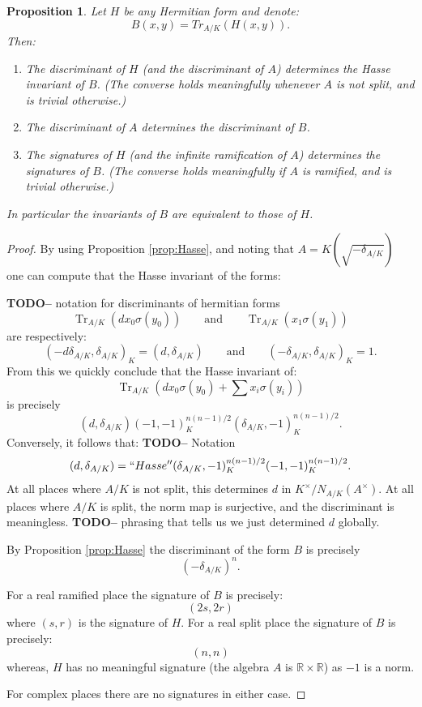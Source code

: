 \documentclass{article}
\theoremstyle{plain}
\newtheorem{proposition}[theorem]{Proposition}
\theoremstyle{definition}
\numberwithin{equation}{section}
\DeclareMathOperator{\Tr}{Tr}
\newcommand{\RR}{\mathbb{R}}
\newcommand{\TODO}[1]{\textbf{TODO-#1}}
\begin{document}
\begin{proposition}\label{prop:InvariantRelations}
Let $H$ be any Hermitian form and denote:
\[ B(x,y) = Tr_{A/K}(H(x,y)). \]
Then:
\begin{enumerate}
\item The discriminant of $H$ (and the discriminant of $A$) determines the Hasse invariant of $B$. (The converse holds meaningfully whenever $A$ is not split, and is trivial otherwise.)
\item The discriminant of $A$ determines the discriminant of $B$.
\item The signatures of $H$ (and the infinite ramification of $A$) determines the signatures of $B$. (The converse holds meaningfully if $A$ is ramified, and is trivial otherwise.)
\end{enumerate}
In particular the invariants of $B$ are equivalent to those of $H$.
\end{proposition}
\begin{proof}
By using Proposition \ref{prop:Hasse}, and noting that $A = K(\sqrt{-\delta_{A/K}})$ one can compute that the Hasse invariant of the forms:

\TODO - notation for discriminants of hermitian forms
\[\Tr_{A/K}(dx_0\sigma(y_0)) \qquad \text{and} \qquad \Tr_{A/K}(x_1\sigma(y_1)) \]
are respectively:
\[ (-d \delta_{A/K}, \delta_{A/K})_K = (d,\delta_{A/K}) \qquad \text{and}\qquad ( -\delta_{A/K}, \delta_{A/K})_K = 1. \]
From this we quickly conclude that the Hasse invariant of:
\[ \Tr_{A/K}\left(dx_0\sigma(y_0) + \sum x_i\sigma(y_i)\right) \]
is precisely
\[ (d,\delta_{A/K})(-1,-1)_K^{n(n-1)/2}(\delta_{A/K},-1)_K^{n(n-1)/2}.\]
Conversely, it follows that:
\TODO - Notation
\[ (d,\delta_{A/K}) = ``Hasse''  (\delta_{A/K},-1)_K^{n(n-1)/2}(-1,-1)_K^{n(n-1)/2}. \]
At all places where $A/K$ is not split, this determines $d$ in $K^\times/N_{A/K}(A^\times)$.
At all places where $A/K$ is split, the norm map is surjective, and the discriminant is meaningless.
\TODO - phrasing that tells us we just determined $d$ globally.


By Proposition \ref{prop:Hasse} the discriminant of the form $B$ is precisely
\[ (-\delta_{A/K})^n. \]

For a real ramified place the signature of $B$ is precisely:
\[ (2s,2r) \]
where $(s,r)$ is the signature of $H$.
For a real split place the signature of $B$ is precisely:
\[ (n,n) \]
whereas, $H$ has no meaningful signature (the algebra $A$ is $\RR\times \RR$) as $-1$ is a norm.

For complex places there are no signatures in either case.
\end{proof}
\end{document}
